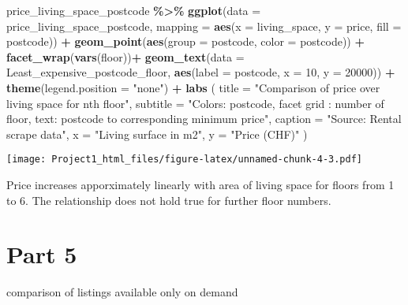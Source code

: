 \documentclass[
]{article}
\newenvironment{Shaded}{\begin{snugshade}}{\end{snugshade}}
\newcommand{\AttributeTok}[1]{\textcolor[rgb]{0.13,0.29,0.53}{#1}}
\newcommand{\DecValTok}[1]{\textcolor[rgb]{0.00,0.00,0.81}{#1}}
\newcommand{\FunctionTok}[1]{\textcolor[rgb]{0.13,0.29,0.53}{\textbf{#1}}}
\newcommand{\NormalTok}[1]{#1}
\newcommand{\SpecialCharTok}[1]{\textcolor[rgb]{0.81,0.36,0.00}{\textbf{#1}}}
\newcommand{\StringTok}[1]{\textcolor[rgb]{0.31,0.60,0.02}{#1}}
\begin{document}
\begin{Shaded}
\begin{Highlighting}[]
\NormalTok{price\_living\_space\_postcode }\SpecialCharTok{\%\textgreater{}\%}
  \FunctionTok{ggplot}\NormalTok{(}\AttributeTok{data =}\NormalTok{ price\_living\_space\_postcode,}
         \AttributeTok{mapping =} \FunctionTok{aes}\NormalTok{(}\AttributeTok{x =}\NormalTok{ living\_space, }\AttributeTok{y =}\NormalTok{ price, }\AttributeTok{fill =}\NormalTok{ postcode)) }\SpecialCharTok{+}
  \FunctionTok{geom\_point}\NormalTok{(}\FunctionTok{aes}\NormalTok{(}\AttributeTok{group =}\NormalTok{ postcode, }\AttributeTok{color =}\NormalTok{ postcode)) }\SpecialCharTok{+} \FunctionTok{facet\_wrap}\NormalTok{(}\FunctionTok{vars}\NormalTok{(floor))}\SpecialCharTok{+}
  \FunctionTok{geom\_text}\NormalTok{(}\AttributeTok{data =}\NormalTok{ Least\_expensive\_postcode\_floor,}
            \FunctionTok{aes}\NormalTok{(}\AttributeTok{label =}\NormalTok{ postcode, }\AttributeTok{x =} \DecValTok{10}\NormalTok{, }\AttributeTok{y =} \DecValTok{20000}\NormalTok{)) }\SpecialCharTok{+}
  \FunctionTok{theme}\NormalTok{(}\AttributeTok{legend.position =} \StringTok{"none"}\NormalTok{) }\SpecialCharTok{+}
  \FunctionTok{labs}\NormalTok{ (}
    \AttributeTok{title =} \StringTok{"Comparison of price over living space for nth floor"}\NormalTok{,}
    \AttributeTok{subtitle =} \StringTok{"Colors: postcode,  facet grid : number of floor,}
\StringTok{    text: postcode to corresponding minimum price"}\NormalTok{,}
    \AttributeTok{caption =} \StringTok{"Source: Rental scrape data"}\NormalTok{,}
    \AttributeTok{x =} \StringTok{"Living surface in m2"}\NormalTok{,}
    \AttributeTok{y =} \StringTok{"Price (CHF)"}
\NormalTok{  )}
\end{Highlighting}
\end{Shaded}

\texttt{[image: Project1\_html\_files/figure-latex/unnamed-chunk-4-3.pdf]}

Price increases apporximately linearly with area of living space for
floors from 1 to 6. The relationship does not hold true for further
floor numbers.

\hypertarget{part-5}{%
\section{Part 5}\label{part-5}}

comparison of listings available only on demand
\end{document}

